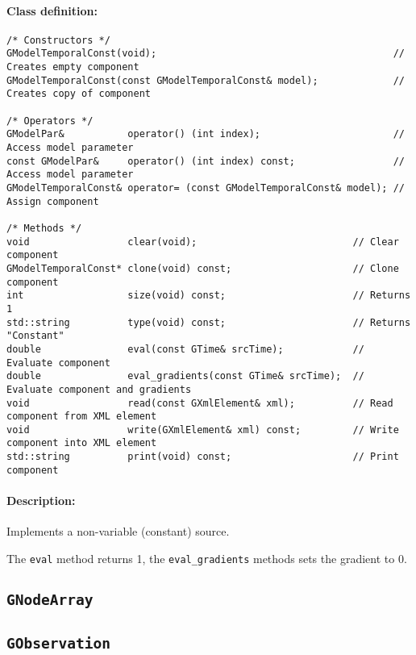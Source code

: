 \documentclass{article}[12pt,a4]
\begin{document}
\paragraph{Class definition:}
\begin{verbatim}
/* Constructors */
GModelTemporalConst(void);                                         // Creates empty component
GModelTemporalConst(const GModelTemporalConst& model);             // Creates copy of component

/* Operators */
GModelPar&           operator() (int index);                       // Access model parameter
const GModelPar&     operator() (int index) const;                 // Access model parameter
GModelTemporalConst& operator= (const GModelTemporalConst& model); // Assign component

/* Methods */
void                 clear(void);                           // Clear component
GModelTemporalConst* clone(void) const;                     // Clone component
int                  size(void) const;                      // Returns 1
std::string          type(void) const;                      // Returns "Constant"
double               eval(const GTime& srcTime);            // Evaluate component
double               eval_gradients(const GTime& srcTime);  // Evaluate component and gradients
void                 read(const GXmlElement& xml);          // Read component from XML element
void                 write(GXmlElement& xml) const;         // Write component into XML element
std::string          print(void) const;                     // Print component
\end{verbatim}

\paragraph{Description:}
Implements a non-variable (constant) source.

The {\tt eval} method returns 1, the {\tt eval\_gradients} methods sets the gradient to 0.


\subsection{{\tt GNodeArray}}

\subsection{{\tt GObservation}}
\end{document}
